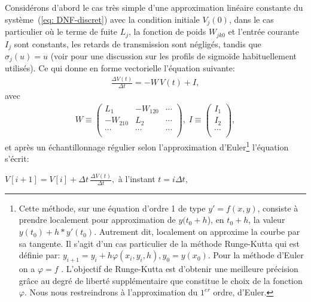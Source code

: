 Considérons d'abord le cas très simple d'une approximation linéaire constante du système~(\ref{eq: DNF-discret}) avec la condition initiale $ V_j (0) $, dans le cas particulier où le terme de fuite $ L_j $, la fonction de poids $W_{jk0} $ et l'entrée courante $I_j$  sont constants, les retards de transmission sont négligés, tandis que  $\sigma_j\left(u\right) = u$ (voir \cite{Alexandre:2009} pour une discussion sur les profils de sigmoïde habituellement utilisés). Ce qui donne en forme vectorielle l'équation suivante:\\
\begin{align}
\frac{\Delta V(t)}{\Delta t} = -{ W} \, { V}(t) + { I},
\end{align}
avec
\begin{align}
\label{eq: def-W}
{ W} \equiv \left(\begin{array}{ccc} L_1 & -W_{120} & \cdots \\ -W_{210} & L_2 & \cdots \\  \cdots & \cdots & \cdots \\ \end{array} \right), \;
{ I} \equiv \left(\begin{array}{c} I_1 \\ I_2 \\ \cdots \\ \end{array} \right),
\end{align}
et après un échantillonnage régulier selon l'approximation d'Euler\footnote{Cette méthode, sur une équation d'ordre 1 de type $y' = f(x,y)$, consiste à prendre localement pour approximation de $y(t_0+h$), en $t_0+h$, la valeur $y(t_0) + h*y'(t_0)$. Autrement dit, localement on approxime la courbe par sa tangente. Il s'agit d'un cas particulier de la méthode Runge-Kutta qui est définie par: $
y_{i+1}=y_{i}+h\varphi(x_{i},y_{i},h), y_{0}=y(x_{0}) $. Pour la méthode d'Euler on a  $\varphi=f $ . L'objectif de Runge-Kutta est d'obtenir une meilleure précision grâce au degré de liberté supplémentaire que constitue le choix de la fonction $\varphi $. Nous nous restreindrons à l'approximation du $1^{er}$ ordre, d'Euler.} \cite{Press:1988} l'équation s'écrit:\\

\begin{center}$ V[i+1] = { V}[i] + \Delta t \, \frac{\Delta V(t)}{\Delta t},$ à l'instant $t = i \Delta t,$ \\\end{center}

